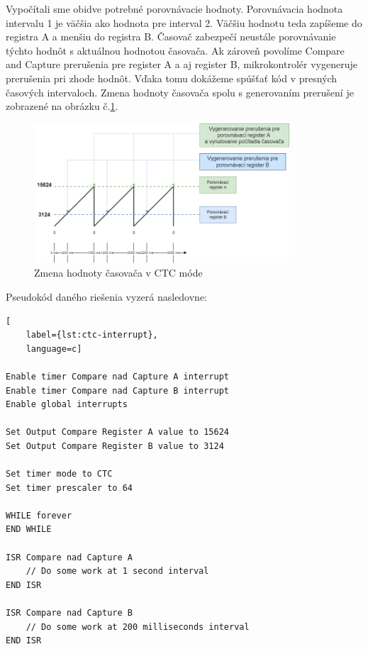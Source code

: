 Vypočítali sme obidve potrebné porovnávacie hodnoty. Porovnávacia hodnota intervalu 1 je väčšia ako hodnota pre interval 2. Väčšiu hodnotu teda zapíšeme do registra A a
menšiu do registra B. Časovač zabezpečí neustále porovnávanie týchto hodnôt s aktuálnou hodnotou časovača. Ak zároveň povolíme Compare and Capture prerušenia pre register
A a aj register B, mikrokontrolér vygeneruje prerušenia pri zhode hodnôt. Vďaka tomu dokážeme spúšťať kód v presných časových intervaloch. Zmena hodnoty časovača spolu
s generovaním prerušení je zobrazené na obrázku č.\ref{figure:ctc-timer-value}.
\begin{figure}[!h]
    \centering
    \includegraphics[width=0.85\textwidth]{img/ctc-timer-value.png}
    \caption{Zmena hodnoty časovača v CTC móde}
    \label{figure:ctc-timer-value}
\end{figure}

Pseudokód daného riešenia vyzerá nasledovne:

\begin{lstlisting}[
    label={lst:ctc-interrupt},
    language=c]  

Enable timer Compare nad Capture A interrupt
Enable timer Compare nad Capture B interrupt
Enable global interrupts

Set Output Compare Register A value to 15624
Set Output Compare Register B value to 3124

Set timer mode to CTC
Set timer prescaler to 64

WHILE forever
END WHILE

ISR Compare nad Capture A
    // Do some work at 1 second interval
END ISR

ISR Compare nad Capture B
    // Do some work at 200 milliseconds interval 
END ISR

\end{lstlisting}

